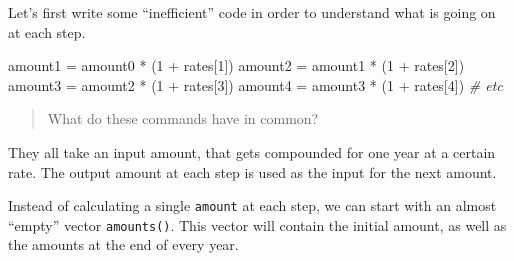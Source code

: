 \documentclass[
]{book}
\newenvironment{Shaded}{\begin{snugshade}}{\end{snugshade}}
\newcommand{\CommentTok}[1]{\textcolor[rgb]{0.56,0.35,0.01}{\textit{#1}}}
\newcommand{\DecValTok}[1]{\textcolor[rgb]{0.00,0.00,0.81}{#1}}
\newcommand{\NormalTok}[1]{#1}
\newcommand{\OtherTok}[1]{\textcolor[rgb]{0.56,0.35,0.01}{#1}}
\newcommand{\SpecialCharTok}[1]{\textcolor[rgb]{0.00,0.00,0.00}{#1}}
\begin{document}
Let's first write some ``inefficient'' code in order to understand what is
going on at each step.

\begin{Shaded}
\begin{Highlighting}[]
\NormalTok{amount1 }\OtherTok{=}\NormalTok{ amount0 }\SpecialCharTok{*}\NormalTok{ (}\DecValTok{1} \SpecialCharTok{+}\NormalTok{ rates[}\DecValTok{1}\NormalTok{])}
\NormalTok{amount2 }\OtherTok{=}\NormalTok{ amount1 }\SpecialCharTok{*}\NormalTok{ (}\DecValTok{1} \SpecialCharTok{+}\NormalTok{ rates[}\DecValTok{2}\NormalTok{])}
\NormalTok{amount3 }\OtherTok{=}\NormalTok{ amount2 }\SpecialCharTok{*}\NormalTok{ (}\DecValTok{1} \SpecialCharTok{+}\NormalTok{ rates[}\DecValTok{3}\NormalTok{])}
\NormalTok{amount4 }\OtherTok{=}\NormalTok{ amount3 }\SpecialCharTok{*}\NormalTok{ (}\DecValTok{1} \SpecialCharTok{+}\NormalTok{ rates[}\DecValTok{4}\NormalTok{])}
\CommentTok{\# etc}
\end{Highlighting}
\end{Shaded}

\begin{quote}
What do these commands have in common?
\end{quote}

They all take an input amount, that gets compounded for one year at a certain
rate. The output amount at each step is used as the input for the next amount.

Instead of calculating a single \texttt{amount} at each step, we can start with
an almost ``empty'' vector \texttt{amounts()}. This vector will contain the initial
amount, as well as the amounts at the end of every year.

\bigskip
\end{document}

